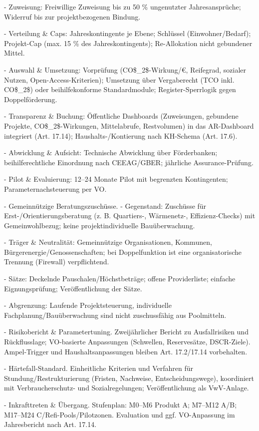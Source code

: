 \documentclass[12pt,a4paper]{scrartcl}
\begin{document}
- Zuweisung: Freiwillige Zuweisung bis zu 50 \% ungenutzter Jahresansprüche; Widerruf bis zur projektbezogenen Bindung.

- Verteilung \& Caps: Jahreskontingente je Ebene; Schlüssel (Einwohner/Bedarf); Projekt-Cap (max. 15 \% des Jahreskontingents); Re-Allokation nicht gebundener Mittel.

- Auswahl \& Umsetzung: Vorprüfung (CO\$\_2\$-Wirkung/€, Reifegrad, sozialer Nutzen, Open-Access-Kriterien); Umsetzung über Vergaberecht (TCO inkl. CO\$\_2\$) oder beihilfekonforme Standardmodule; Register-Sperrlogik gegen Doppelförderung.

- Transparenz \& Buchung: Öffentliche Dashboards (Zuweisungen, gebundene Projekte, CO\$\_2\$-Wirkungen, Mittelabrufe, Restvolumen) in das AR-Dashboard integriert (Art. 17.14); Haushalts-/Kontierung nach KH-Schema (Art. 17.6).

- Abwicklung \& Aufsicht: Technische Abwicklung über Förderbanken; beihilferechtliche Einordnung nach CEEAG/GBER; jährliche Assurance-Prüfung.

- Pilot \& Evaluierung: 12--24 Monate Pilot mit begrenzten Kontingenten; Parameternachsteuerung per VO.

- Gemeinnützige Beratungszuschüsse.
- Gegenstand: Zuschüsse für Erst-/Orientierungsberatung (z. B. Quartiers-, Wärmenetz-, Effizienz-Checks) mit Gemeinwohlbezug; keine projektindividuelle Bauüberwachung.

- Träger \& Neutralität: Gemeinnützige Organisationen, Kommunen, Bürgerenergie/Genossenschaften; bei Doppelfunktion ist eine organisatorische Trennung (Firewall) verpflichtend.

- Sätze: Deckelnde Pauschalen/Höchstbeträge; offene Providerliste; einfache Eignungsprüfung; Veröffentlichung der Sätze.

- Abgrenzung: Laufende Projektsteuerung, individuelle Fachplanung/Bauüberwachung sind nicht zuschussfähig aus Poolmitteln.

- Risikobericht \& Parametertuning. Zweijährlicher Bericht zu Ausfallrisiken und Rückflusslage; VO-basierte Anpassungen (Schwellen, Reservesätze, DSCR-Ziele). Ampel-Trigger und Haushaltsanpassungen bleiben Art. 17.2/17.14 vorbehalten.

- Härtefall-Standard. Einheitliche Kriterien und Verfahren für Stundung/Restrukturierung (Fristen, Nachweise, Entscheidungswege), koordiniert mit Verbraucherschutz- und Sozialregelungen; Veröffentlichung als VwV-Anlage.

- Inkrafttreten \& Übergang. Stufenplan: M0--M6 Produkt A; M7--M12 A/B; M17--M24 C/Refi-Pools/Pilotzonen. Evaluation und ggf. VO-Anpassung im Jahresbericht nach Art. 17.14.
\end{document}
